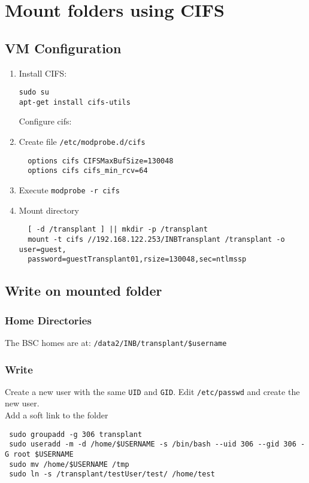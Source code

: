 \documentclass[a4paper,10pt]{article}
\begin{document}
\section{Mount folders using CIFS}
\subsection{VM Configuration}
\begin{enumerate}
\item Install CIFS:
\begin{verbatim}
sudo su
apt-get install cifs-utils
\end{verbatim}
Configure cifs:

 \item Create file \texttt{/etc/modprobe.d/cifs}
 \begin{verbatim}
  options cifs CIFSMaxBufSize=130048
  options cifs cifs_min_rcv=64
 \end{verbatim}
 \item Execute \texttt{modprobe -r cifs}
 \item Mount directory 
 \begin{verbatim}
  [ -d /transplant ] || mkdir -p /transplant
  mount -t cifs //192.168.122.253/INBTransplant /transplant -o user=guest,
  password=guestTransplant01,rsize=130048,sec=ntlmssp
 \end{verbatim}
\end{enumerate}
\subsection{Write on mounted folder}
\subsubsection{Home Directories}
The BSC homes are at:
\texttt{/data2/INB/transplant/\$username}
\subsubsection{Write}
Create a new user with the same \texttt{UID} and \texttt{GID}. Edit \texttt{/etc/passwd} and create the new user.\\
Add a soft link to the folder 
\begin{verbatim}
 sudo groupadd -g 306 transplant
 sudo useradd -m -d /home/$USERNAME -s /bin/bash --uid 306 --gid 306 -G root $USERNAME
 sudo mv /home/$USERNAME /tmp
 sudo ln -s /transplant/testUser/test/ /home/test
\end{verbatim}
\end{document}
